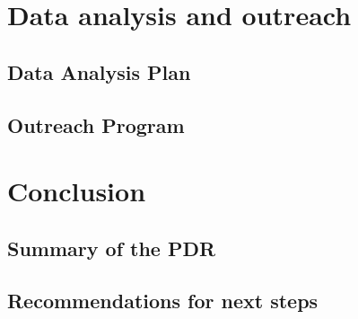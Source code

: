 \documentclass[11pt]{article}
\begin{document}
\section{Data analysis and outreach}

\subsection{Data Analysis Plan}

\subsection{Outreach Program}

\section{Conclusion}

\subsection{Summary of the PDR}

\subsection{Recommendations for next steps}
\end{document}
